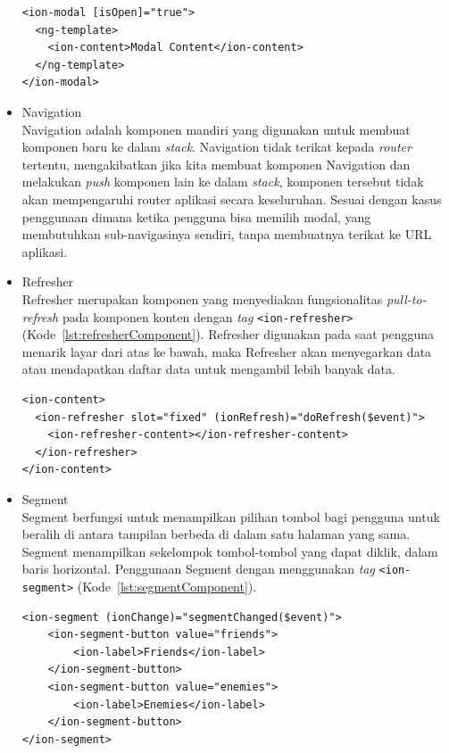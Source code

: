 \begin{itemize}
\begin{lstlisting}[label={lst:modalComponent}, caption=Kode Program dari Modal]
<ion-modal [isOpen]="true">
  <ng-template>
    <ion-content>Modal Content</ion-content>
  </ng-template>
</ion-modal>
\end{lstlisting} 



	\item Navigation \\
	Navigation adalah komponen mandiri yang digunakan untuk membuat komponen baru ke dalam {\it stack}. Navigation tidak terikat kepada {\it router} tertentu, mengakibatkan jika kita membuat komponen Navigation dan melakukan {\it push} komponen lain ke dalam {\it stack}, komponen tersebut tidak akan mempengaruhi router aplikasi secara keseluruhan. Sesuai dengan kasus penggunaan dimana ketika pengguna bisa memilih modal, yang membutuhkan sub-navigasinya sendiri, tanpa membuatnya terikat ke URL aplikasi. 
	
	\item Refresher \\
	Refresher merupakan komponen yang menyediakan fungsionalitas \textit{pull-to-refresh} pada komponen konten dengan \textit{tag} \texttt{<ion-refresher>} (Kode~\ref{lst:refresherComponent}). Refresher digunakan pada saat pengguna menarik layar dari atas ke bawah, maka Refresher akan menyegarkan data atau mendapatkan daftar data untuk mengambil lebih banyak data. 
	
\begin{lstlisting}[label={lst:refresherComponent}, caption=Kode Program dari Refresher]
<ion-content>
  <ion-refresher slot="fixed" (ionRefresh)="doRefresh($event)">
    <ion-refresher-content></ion-refresher-content>
  </ion-refresher>
</ion-content>
\end{lstlisting}
	\item Segment \\
	Segment berfungsi untuk menampilkan pilihan tombol bagi pengguna untuk beralih di antara tampilan berbeda di dalam satu halaman yang sama. Segment menampilkan sekelompok tombol-tombol yang dapat diklik, dalam baris horizontal. Penggunaan Segment dengan menggunakan {\it tag} \texttt{<ion-segment>} (Kode~\ref{lst:segmentComponent}).
	
\begin{lstlisting}[label={lst:segmentComponent}, caption=Kode Program dari Segment]
<ion-segment (ionChange)="segmentChanged($event)">
	<ion-segment-button value="friends">
		<ion-label>Friends</ion-label>
	</ion-segment-button>
	<ion-segment-button value="enemies">
		<ion-label>Enemies</ion-label>
	</ion-segment-button>
</ion-segment>
\end{lstlisting}
	

\end{itemize}
